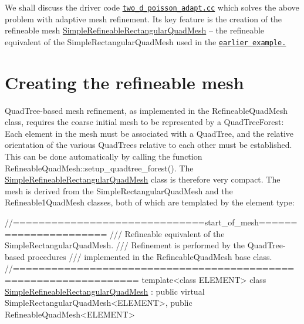 We shall discuss the driver code \href{../../../../demo_drivers/poisson/two_d_poisson_adapt/two_d_poisson_adapt.cc}{\tt two\+\_\+d\+\_\+poisson\+\_\+adapt.\+cc} which solves the above problem with adaptive mesh refinement. Its key feature is the creation of the refineable mesh {\ttfamily \hyperlink{classSimpleRefineableRectangularQuadMesh}{Simple\+Refineable\+Rectangular\+Quad\+Mesh}} -- the refineable equivalent of the {\ttfamily Simple\+Rectangular\+Quad\+Mesh} used in the \href{../../../poisson/two_d_poisson/html/index.html}{\tt earlier example.} 

 

\hypertarget{index_refineable}{}\section{Creating the refineable mesh}\label{index_refineable}
{\ttfamily Quad\+Tree-\/based} mesh refinement, as implemented in the {\ttfamily Refineable\+Quad\+Mesh} class, requires the coarse initial mesh to be represented by a {\ttfamily Quad\+Tree\+Forest\+:} Each element in the mesh must be associated with a {\ttfamily Quad\+Tree}, and the relative orientation of the various {\ttfamily Quad\+Trees} relative to each other must be established. This can be done automatically by calling the function {\ttfamily Refineable\+Quad\+Mesh\+::setup\+\_\+quadtree\+\_\+forest()}. The {\ttfamily \hyperlink{classSimpleRefineableRectangularQuadMesh}{Simple\+Refineable\+Rectangular\+Quad\+Mesh}} class is therefore very compact. The mesh is derived from the {\ttfamily Simple\+Rectangular\+Quad\+Mesh} and the {\ttfamily Refineable1\+Quad\+Mesh} classes, both of which are templated by the element type\+:

 
\begin{DoxyCodeInclude}
\textcolor{comment}{//==============================start\_of\_mesh======================}
\textcolor{comment}{/// Refineable equivalent of the SimpleRectangularQuadMesh.}
\textcolor{comment}{}\textcolor{comment}{/// Refinement is performed by the QuadTree-based procedures}
\textcolor{comment}{}\textcolor{comment}{/// implemented in the RefineableQuadMesh base class.}
\textcolor{comment}{}\textcolor{comment}{//=================================================================}
\textcolor{keyword}{template}<\textcolor{keyword}{class} ELEMENT>
\textcolor{keyword}{class }\hyperlink{classSimpleRefineableRectangularQuadMesh}{SimpleRefineableRectangularQuadMesh} : 
 \textcolor{keyword}{public} \textcolor{keyword}{virtual} SimpleRectangularQuadMesh<ELEMENT>,  
 \textcolor{keyword}{public} RefineableQuadMesh<ELEMENT>

\end{DoxyCodeInclude}


